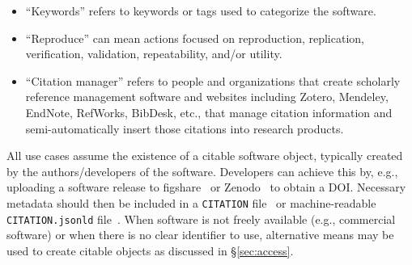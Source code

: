 \documentclass[12pt, oneside]{amsart}
\begin{document}
\begin{itemize}
\item ``Keywords'' refers to keywords or tags used to categorize the software.

\item ``Reproduce'' can mean actions focused on reproduction, replication, verification, validation, repeatability, and\slash or utility.

\item ``Citation manager'' refers to people and organizations that create scholarly reference
management software and websites including Zotero, Mendeley, EndNote, RefWorks, BibDesk, etc.,
that manage citation information and semi-automatically insert those citations into research products.

\end{itemize}

All use cases assume the existence of a citable software object, typically created by the authors\slash developers of the software.
Developers can achieve this by, e.g., uploading a software release to figshare~\cite{figshare} or Zenodo~\cite{github-citable-code-guide} to obtain a DOI.
Necessary metadata should then be included in a \texttt{CITATION} file~\cite{ssi-citation-files} or machine-readable \texttt{CITATION.jsonld} file~\cite{transitive_credit_json-ld}.
When software is not freely available (e.g., commercial software) or when there is no clear identifier
to use, alternative means may be used to create citable objects as discussed in \S\ref{sec:access}.
\end{document}
